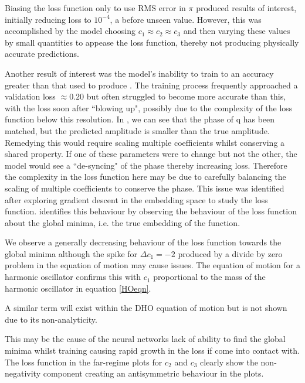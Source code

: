 \documentclass[10pt]{iopart}
\begin{document}
Biasing the loss function only to use RMS error in $\pi$ produced results of interest, initially reducing loss to $10^{-4}$, a before unseen value. However, this was accomplished by the model choosing $c_1\approx c_2\approx c_3$ and then varying these values by small quantities to appease the loss function, thereby not producing physically accurate predictions. 

Another result of interest was the model's inability to train to an accuracy greater than that used to produce . The training process frequently approached a validation loss $\approx 0.20$ but often struggled to become more accurate than this, with the loss soon after ``blowing up", possibly due to the complexity of the loss function below this resolution. In , we can see that the phase of q has been matched, but the predicted amplitude is smaller than the true amplitude. Remedying this would require scaling multiple coefficients whilst conserving a shared property. If one of these parameters were to change but not the other, the model would see a ``de-syncing" of the phase thereby increasing loss. Therefore the complexity in the loss function here may be due to carefully balancing the scaling of multiple coefficients to conserve the phase. This issue was identified after exploring gradient descent in the embedding space to study the loss function.  identifies this behaviour by observing the behaviour of the loss function about the global minima, i.e. the true embedding of the function.

We observe a generally decreasing behaviour of the loss function towards the global minima although the spike for $\Delta c_1 = -2$ produced by a divide by zero problem in the equation of motion may cause issues. The equation of motion for a harmonic oscillator confirms this with $c_1$ proportional to the mass of the harmonic oscillator in equation \ref{HOeqn}.

A similar term will exist within the DHO equation of motion but is not shown due to its non-analyticity. 

This may be the cause of  the neural networks lack of ability to find the global minima whilst training causing rapid growth in the loss if come into contact with. The loss function in the far-regime plots for $c_2$ and $c_3$ clearly show the non-negativity component creating an antisymmetric behaviour in the plots. 
\end{document}

